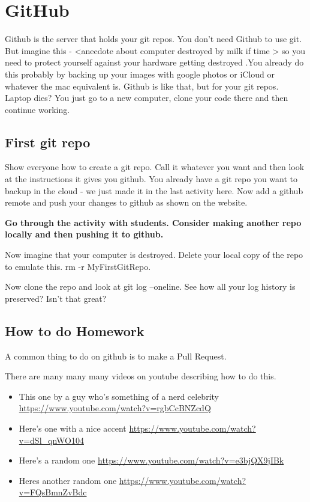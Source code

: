 \documentclass[10pt]{article}
\begin{document}
\section{GitHub}
Github is the server that holds your git repos. You don't need Github to use
git. But imagine this - <anecdote about computer destroyed by milk if time > so
you need to protect yourself against your hardware getting destroyed .You
already do this probably by backing up your images with google photos or iCloud
or whatever the mac equivalent is. Github is like that, but for your git repos.
Laptop dies? You just go to a new computer, clone your code there and then
continue working.


\subsection{First git repo}
Show everyone how to create a git repo. Call it whatever you want and then look
at the instructions it gives you github. You already have a git repo you want to
backup in the cloud - we just made it in the last activity here. Now add a
github remote and push your changes to github as shown on the website. 

\textbf{ Go through the activity with students. Consider making another repo
locally and then pushing it to github.}

Now imagine that your computer is destroyed. Delete your local copy of the repo
to emulate this. rm -r MyFirstGitRepo. 

Now clone the repo and look at git log --oneline. See how all your log history
is preserved? Isn't that great? 

\subsection{How to do Homework}

A common thing to do on github is to make a Pull Request.

There are many many many videos on youtube describing how to do this.

\begin{itemize}
\item This one by a guy who's something of a nerd celebrity \url{https://www.youtube.com/watch?v=rgbCcBNZcdQ}
\item Here's one with a nice accent
\url{https://www.youtube.com/watch?v=dSl_qnWO104}
\item Here's a random one \url{https://www.youtube.com/watch?v=e3bjQX9jIBk}
\item Heres another random one
\url{https://www.youtube.com/watch?v=FQsBmnZvBdc}
\end{itemize}
\end{document}
